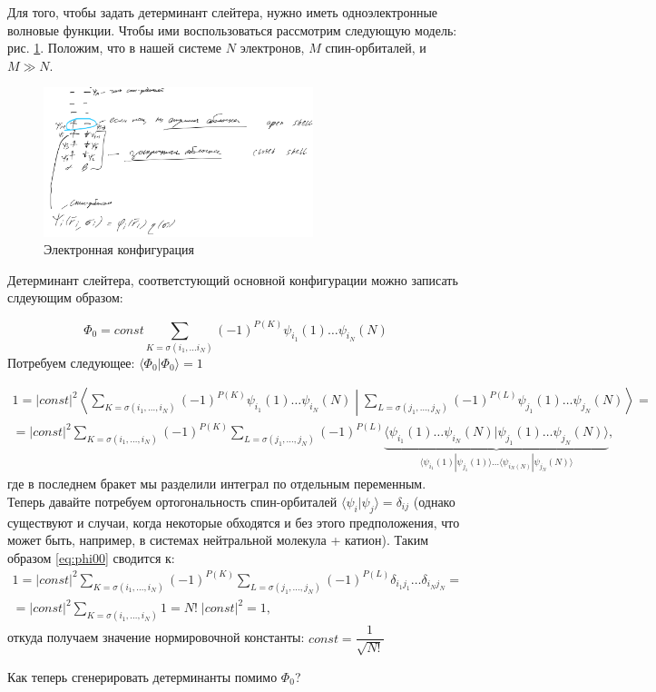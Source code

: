 \documentclass[12pt, oneside]{article}
\numberwithin{equation}{section}  %
\begin{document}
Для того, чтобы задать детерминант слейтера, нужно иметь одноэлектронные волновые функции. Чтобы ими воспользоваться рассмотрим следующую модель: рис. \ref{fig:spinorbitals}. Положим, что в нашей системе \(N\) электронов, \(M\) спин-орбиталей, и \(M \gg N\).

\begin{figure}
    \centering
    \includegraphics[width=0.7\textwidth]{./images/spin-orbitals.png}
    \caption{Электронная конфигурация}
    \label{fig:spinorbitals}
\end{figure}

Детерминант слейтера, соответстующий основной конфигурации можно записать слдеующим образом: 

\begin{equation}
\Phi_0 = const \sum_{K = \sigma(i_1, \dots i_N)} (-1)^{P(K)} \psi_{i_1}(1) \dots \psi_{i_N}(N)
\end{equation}
Потребуем следующее: \(\langle \Phi_0 | \Phi_0 \rangle = 1\)

\begin{multline}
1 = |const|^2 \left\langle \sum_{K = \sigma(i_1, \dots, i_N)} (-1)^{P(K)} \psi_{i_1} (1) \dots \psi_{i_N} (N) \middle| \sum_{L = \sigma(j_1, \dots, j_N)} (-1)^{P(L)} \psi_{j_1} (1) \dots \psi_{j_N} (N) \right\rangle =\\= 
|const|^2 \sum_{K = \sigma(i_1, \dots, i_N)} (-1)^{P(K)} \sum_{L = \sigma(j_1, \dots, j_N)} (-1)^{P(L)} \underbrace{\langle \psi_{i_1} (1) \dots \psi_{i_N} (N) | \psi_{j_1} (1) \dots \psi_{j_N} (N) \rangle}_{\langle\psi_{i_1} (1) | \psi_{j_1} (1) \rangle \dots \langle \psi_{i_N(N)} | \psi_{j_N}(N) \rangle},
\label{eq:phi00}
\end{multline}
где в последнем бракет мы разделили интеграл по отдельным переменным. Теперь давайте потребуем ортогональность спин-орбиталей \(\langle \psi_i | \psi_j \rangle = \delta_{ij}\) (однако существуют и случаи, когда некоторые обходятся и без этого предположения, что может быть, например, в системах нейтральной молекула + катион). Таким образом \eqref{eq:phi00} сводится к:
\begin{multline}
1 = |const|^2 \sum_{K = \sigma(i_1, \dots, i_N)} (-1)^{P(K)} \sum_{L = \sigma(j_1, \dots, j_N)} (-1)^{P(L)} \delta_{i_1 j_1} \dots \delta_{i_N j_N} =\\=
|const|^2 \sum_{K = \sigma (i_1, \dots, i_N)} 1 = N! \; |const|^2 = 1,
\end{multline}
откуда получаем значение нормировочной константы: \(const = \dfrac{1}{\sqrt{N!}}\)

Как теперь сгенерировать детерминанты помимо \(\Phi_0\)?
\end{document}
